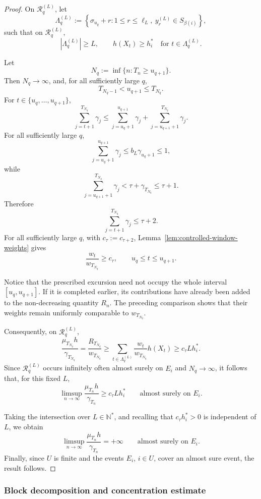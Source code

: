 \documentclass[10pt,letterpaper]{article}
\theoremstyle{compactplain}
\theoremstyle{compactdefinition}
\newcommand{\1}{\mathds{1}}
\begin{document}
\begin{proof}
On \(\mathcal R_q^{(L)}\), let
\[
\Lambda_q^{(L)}
:=
\left\{
\sigma_{u_q}+r:
1\leq r\leq\ell_L,\
y_r^{(L)}\in S_{\beta(i)}
\right\},
\]
such that on \(\mathcal R_q^{(L)}\),
\[
|\Lambda_q^{(L)}|\geq L,
\qquad
h(X_t)\geq h_i^*
\quad\text{for }t\in\Lambda_q^{(L)}.
\]

Let
\[
N_q:=\inf\{n:T_n\geq u_{q+1}\}.
\]
Then \(N_q\to\infty\), and, for all sufficiently large \(q\),
\[
T_{N_q-1}<u_{q+1}\leq T_{N_q}.
\]
For \(t\in\{u_q,\ldots,u_{q+1}\}\),
\[
\sum_{j=t+1}^{T_{N_q}}\gamma_j
\leq
\sum_{j=u_q+1}^{u_{q+1}}\gamma_j
+
\sum_{j=u_{q+1}+1}^{T_{N_q}}\gamma_j.
\]
For all sufficiently large \(q\),
\[
\sum_{j=u_q+1}^{u_{q+1}}\gamma_j
\leq
b_L\gamma_{u_q+1}
\leq1,
\]
while
\[
\sum_{j=u_{q+1}+1}^{T_{N_q}}\gamma_j
<
\tau+\gamma_{T_{N_q}}
\leq\tau+1.
\]
Therefore
\[
\sum_{j=t+1}^{T_{N_q}}\gamma_j\leq\tau+2.
\]
For all sufficiently large \(q\), with
\(c_\tau:=c_{\tau+2}\), Lemma~\ref{lem:controlled-window-weights} gives
\[
\frac{w_t}{w_{T_{N_q}}}
\geq
c_\tau,
\qquad
u_q\leq t\leq u_{q+1}.
\]

Notice that the prescribed excursion need not occupy the whole interval \([u_q,u_{q+1}]\). If it is completed earlier, its contributions have already
been added to the non-decreasing quantity \(R_n\). The preceding comparison shows that their weights remain uniformly comparable to
\(w_{T_{N_q}}\).



Consequently, on \(\mathcal R_q^{(L)}\),
\[
\frac{\mu_{T_{N_q}}h}{\gamma_{T_{N_q}}}
=
\frac{R_{T_{N_q}}}{w_{T_{N_q}}}
\geq
\sum_{t\in\Lambda_q^{(L)}}
\frac{w_t}{w_{T_{N_q}}}h(X_t)
\geq
c_\tau Lh_i^*.
\]
Since \(\mathcal R_q^{(L)}\) occurs infinitely often almost surely on \(E_i\)
and \(N_q\to\infty\), it follows that, for this fixed \(L\),
\[
\limsup_{n\to\infty}
\frac{\mu_{T_n}h}{\gamma_{T_n}}
\geq
c_\tau Lh_i^*
\qquad\text{almost surely on }E_i.
\]

Taking the intersection over \(L\in\mathbb N^*\), and recalling that \(c_\tau h_i^*>0\) is independent of \(L\), we obtain
\[
\limsup_{n\to\infty}
\frac{\mu_{T_n}h}{\gamma_{T_n}}
=
+\infty
\qquad\text{almost surely on }E_i.
\]
Finally, since \(U\) is finite and the events \(E_i\), \(i\in U\), cover an almost sure event, the result follows.



\end{proof}






\subsubsection{Block decomposition and concentration estimate}
\end{document}
